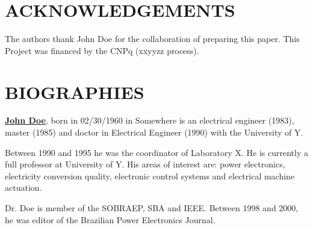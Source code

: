 \documentclass[english]{sobraep}
\begin{document}
\section*{ACKNOWLEDGEMENTS}
The authors thank John Doe for the collaboration of preparing this paper. This Project was financed by the CNPq (xxyyzz process).





\balance

\section*{BIOGRAPHIES}
\noindent\textbf{\underline{John Doe}}, born in 02/30/1960 in Somewhere is an electrical engineer (1983), master (1985) and doctor in Electrical Engineer (1990) with the University of Y.

Between 1990 and 1995 he was the coordinator of Laboratory X. He is currently a full professor at University of Y. His areas of interest are: power electronics, electricity conversion quality, electronic control systems and electrical machine actuation.

Dr. Doe is member of the SOBRAEP, SBA and IEEE. Between 1998 and 2000, he was editor of the Brazilian \linebreak Power Electronics Journal.
\end{document}
